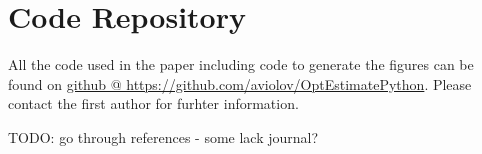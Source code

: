 \documentclass{article}
\begin{document}
\section{Code Repository}
All the code used in the paper including code to generate the figures can be
found on
\href{https://github.com/aviolov/OptEstimatePython}{github @
https://github.com/aviolov/OptEstimatePython}. Please contact the first author
for furhter information.

\clearpage     
%   

TODO: go through references - some lack journal?
 
\end{document}
